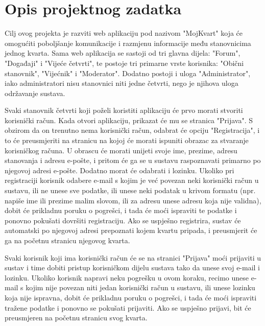 \chapter{Opis projektnog zadatka}
		
	Cilj ovog projekta je razviti web aplikaciju pod nazivom "MojKvart" koja će omogućiti poboljšanje komunikacije i razmjenu informacije među stanovnicima jednog kvarta. Sama web aplikacija se sastoji od tri glavna dijela: "Forum", "Događaji" i "Vijeće četvrti", te postoje tri primarne vrste korisnika: "Obični stanovnik", "Vijećnik" i "Moderator". Dodatno postoji i uloga "Administrator", iako administratori nisu stanovnici niti jedne četvrti, nego je njihova uloga održavanje sustava.
	
	Svaki stanovnik četvrti koji poželi koristiti aplikaciju će prvo morati stvoriti korisnički račun. Kada otvori aplikaciju, prikazat će mu se stranica "Prijava". S obzirom da on trenutno nema korisnički račun, odabrat će opciju "Registracija", i to će preusmjeriti na stranicu na kojoj će morati ispuniti obrazac za stvaranje korisničkog računa. U obrascu će morati unijeti svoje ime, prezime, adresu stanovanja i adresu e-pošte, i pritom će ga se u sustavu raspoznavati primarno po njegovoj adresi e-pošte. Dodatno morat će odabrati i lozinku. Ukoliko pri registraciji korisnik odabere e-mail s kojim je već povezan neki korisnički račun u sustavu, ili ne unese sve podatke, ili unese neki podatak u krivom formatu (npr. napiše ime ili prezime malim slovom, ili za adresu unese adresu koja nije validna), dobit će prikladnu poruku o pogrešci, i tada će moći ispraviti te podatke i ponovno pokušati dovršiti registraciju. Ako se uspješno registrira, sustav će automatski po njegovoj adresi prepoznati kojem kvartu pripada, i preusmjerit će ga na početnu stranicu njegovog kvarta.
	
	Svaki korisnik koji ima korisnički račun će se na stranici "Prijava" moći prijaviti u sustav i time dobiti pristup korisničkom dijelu sustava tako da unese svoj e-mail i lozinku. Ukoliko korisnik napravi neku pogrešku u ovom koraku, recimo unese e-mail s kojim nije povezan niti jedan korisnički račun u sustavu, ili unese lozinku koja nije ispravna, dobit će prikladnu poruku o pogrešci, i tada će moći ispraviti tražene podatke i ponovno se pokušati prijaviti. Ako se uspješno prijavi, bit će preusmjeren na početnu stranicu svog kvarta.